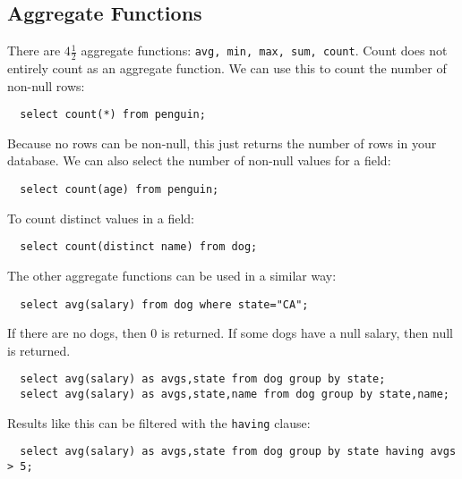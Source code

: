 \documentclass{math}
\begin{document}
\subsection*{Aggregate Functions}
There are \( 4\frac{1}{2} \) aggregate functions: \texttt{avg, min, max, sum,
count}. Count does not entirely count as an aggregate function. We can use
this to count the number of non-null rows:
\begin{lstlisting}
  select count(*) from penguin;
\end{lstlisting}
Because no rows can be non-null, this just returns the number of rows in your
database. We can also select the number of non-null values for a field:
\begin{lstlisting}
  select count(age) from penguin;
\end{lstlisting}
To count distinct values in a field:
\begin{lstlisting}
  select count(distinct name) from dog;
\end{lstlisting}
The other aggregate functions can be used in a similar way:
\begin{lstlisting}
  select avg(salary) from dog where state="CA";
\end{lstlisting}
If there are no dogs, then 0 is returned. If some dogs have a null salary, then
null is returned.
\begin{lstlisting}
  select avg(salary) as avgs,state from dog group by state;
  select avg(salary) as avgs,state,name from dog group by state,name;
\end{lstlisting}
Results like this can be filtered with the \texttt{having} clause:
\begin{lstlisting}
  select avg(salary) as avgs,state from dog group by state having avgs > 5;
\end{lstlisting}
\end{document}
